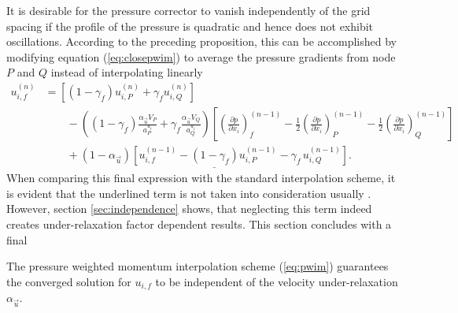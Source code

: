 It is desirable for the pressure corrector to vanish independently of the grid spacing if the profile of the pressure is quadratic and hence does not exhibit oscillations. According to the preceding proposition, this can be accomplished by modifying equation (\ref{eq:closepwim}) to average the pressure gradients from node \(P\) and \(Q\) instead of interpolating linearly
\begin{align}
  u_{i,f}^{(n)} 
  &=
  \left[\left(1 - \gamma_f\right) u_{i,P}^{(n)} + \gamma_f u_{i,Q}^{(n)} \right] \nonumber\\[1em]
  &\quad\quad - 
  \left(\left(1 - \gamma_f\right) \frac{\alpha_\vec{u} V_P}{a_P^{u_i}} + \gamma_f \frac{\alpha_\vec{u} V_Q}{a_Q^{u_i}}\right)
  \left[ 
  \left(\frac{\partial p}{\partial x_i}\right)_f^{(n-1)} 
  - \frac{1}{2} \left( \frac{\partial p}{\partial x_i} \right)_P^{(n-1)} 
  - \frac{1}{2} \left(\frac{\partial p}{\partial x_i}\right)_Q^{(n-1)}
  \right] \nonumber \\[1em]
  \label{eq:pwim}
  &\quad\quad + \underline{\left(1 - \alpha_\vec{u}\right) \left[ u_{i,f}^{(n-1)} - \left(1 - \gamma_f\right) u_{i,P}^{(n-1)} - \gamma_f \, u_{i,Q}^{(n-1)} \right]}.
\end{align}
When comparing this final expression with the standard interpolation scheme, it is evident that the underlined term is not taken into consideration usually \cite{ferziger02}. However, section \ref{sec:independence} shows, that neglecting this term indeed creates under-relaxation factor dependent results. This section concludes with a final
\begin{prop}
  The pressure weighted momentum interpolation scheme (\ref{eq:pwim}) guarantees the converged solution for \(u_{i,f}\) to be independent of the velocity under-relaxation \(\alpha_\vec{u}\).
\end{prop}
